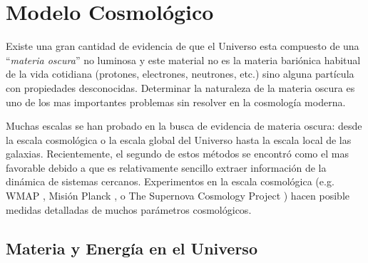 
\chapter{Modelo Cosmológico}   %
\label{Chp:MatOsc}
\setcounter{equation}{0}


\setcounter{equation}{0}

Existe una gran cantidad de evidencia de que el Universo esta compuesto de una ``\textit{materia oscura}'' no luminosa y este material no es la materia bariónica habitual de la vida cotidiana (protones, electrones, neutrones, etc.) sino alguna  partícula con propiedades desconocidas. Determinar la naturaleza de la materia oscura es uno de los mas importantes  problemas sin resolver en la cosmología moderna.

Muchas escalas se han probado en la busca de evidencia de materia oscura: desde la escala cosmológica o la escala global del Universo  hasta la escala local de las galaxias. Recientemente, el segundo de estos métodos se encontró como el mas favorable debido a que es relativamente sencillo extraer información de la dinámica de sistemas cercanos. Experimentos en la escala cosmológica (e.g. WMAP \cite{ 2013ApJS..208...20B}, Misión Planck \cite{2020A&A...641A...1P}, o The Supernova Cosmology Project \cite{1999ApJ...517..565P}) hacen posible medidas detalladas de muchos parámetros cosmológicos. %

\section{Materia y Energía en el Universo}

